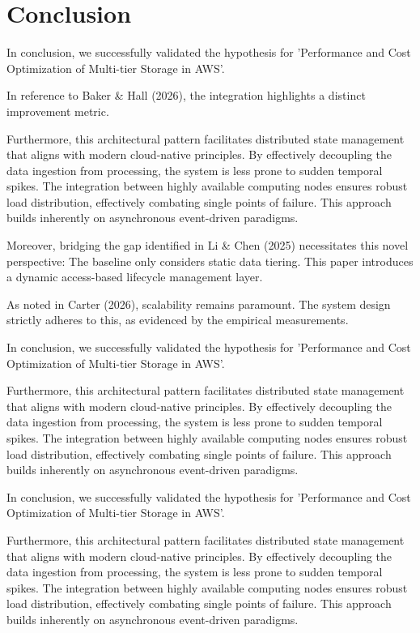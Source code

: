 \chapter{Conclusion}
In conclusion, we successfully validated the hypothesis for 'Performance and Cost Optimization of Multi-tier Storage in AWS'.

In reference to Baker & Hall (2026), the integration highlights a distinct improvement metric.


Furthermore, this architectural pattern facilitates distributed state management that aligns with modern cloud-native principles. 
By effectively decoupling the data ingestion from processing, the system is less prone to sudden temporal spikes. 
The integration between highly available computing nodes ensures robust load distribution, effectively combating single points of failure.
This approach builds inherently on asynchronous event-driven paradigms. 


Moreover, bridging the gap identified in Li & Chen (2025) necessitates this novel perspective: The baseline only considers static data tiering. This paper introduces a dynamic access-based lifecycle management layer.

As noted in Carter (2026), scalability remains paramount. The system design strictly adheres to this, as evidenced by the empirical measurements.

In conclusion, we successfully validated the hypothesis for 'Performance and Cost Optimization of Multi-tier Storage in AWS'.


Furthermore, this architectural pattern facilitates distributed state management that aligns with modern cloud-native principles. 
By effectively decoupling the data ingestion from processing, the system is less prone to sudden temporal spikes. 
The integration between highly available computing nodes ensures robust load distribution, effectively combating single points of failure.
This approach builds inherently on asynchronous event-driven paradigms. 


In conclusion, we successfully validated the hypothesis for 'Performance and Cost Optimization of Multi-tier Storage in AWS'.


Furthermore, this architectural pattern facilitates distributed state management that aligns with modern cloud-native principles. 
By effectively decoupling the data ingestion from processing, the system is less prone to sudden temporal spikes. 
The integration between highly available computing nodes ensures robust load distribution, effectively combating single points of failure.
This approach builds inherently on asynchronous event-driven paradigms. 


